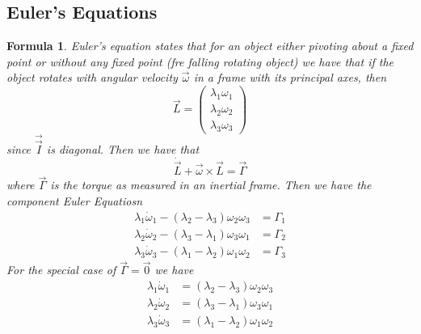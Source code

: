 \documentclass[12pt]{article}
\newtheorem{for}[thm]{Formula}
\theoremstyle{definition}
\theoremstyle{remark}
\numberwithin{equation}{section}
\begin{document}
\subsection{Euler's Equations}


\begin{for}
        Euler's equation states that for an object either pivoting about a fixed point or without any fixed point (fre falling rotating object) we have that if the object rotates with angular velocity $\vec{\omega}$ in a frame with its principal axes, then \begin{equation}
                \vec{L} = \begin{pmatrix} \lambda_1\omega_1 \\ \lambda_2\omega_2 \\ \lambda_3\omega_3 \end{pmatrix}
        \end{equation}
        since $\vec{\vec{I}}$ is diagonal. Then we have that \begin{equation}
                \dot{\vec{L}} +\vec{\omega}\times \vec{L} = \vec{\Gamma}
        \end{equation}
        where $\vec{\Gamma}$ is the torque as measured in an inertial frame. Then we have the component Euler Equatiosn \begin{align}
                \lambda_1\dot{\omega}_1 - (\lambda_2-\lambda_3)\omega_2\omega_3 &= \Gamma_1 \\
                \lambda_2\dot{\omega}_2 - (\lambda_3-\lambda_1)\omega_3\omega_1 &= \Gamma_2 \\
                \lambda_3\dot{\omega}_3 - (\lambda_1-\lambda_2)\omega_1\omega_2 &= \Gamma_3 
        \end{align}
        For the special case of $\vec{\Gamma} = \vec{0}$ we have \begin{align}
                \lambda_1\dot{\omega}_1 &= (\lambda_2-\lambda_3)\omega_2\omega_3    \\ 
                \lambda_2\dot{\omega}_2 &= (\lambda_3-\lambda_1)\omega_3\omega_1   \\      
                \lambda_3\dot{\omega}_3 &= (\lambda_1-\lambda_2)\omega_1\omega_2 
        \end{align}
\end{for}
\end{document}
